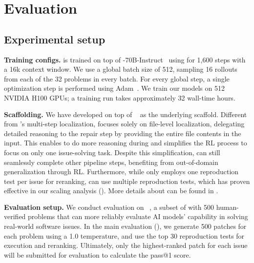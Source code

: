 \section{Evaluation}
\label{section:evaluation}

\subsection{Experimental setup}
\label{subsec:setup}

\textbf{Training configs.}
\ours[70] is trained on top of -70B-Instruct~\cite{llama31} using \tech for 1,600 steps with a 16k context window.
We use a global batch size of 512, sampling 16 rollouts from each of the 32 problems in every batch.
For every global step, a single optimization step is performed using Adam~\cite{adam}.
We train our models on 512 NVIDIA H100 GPUs; a training run takes approximately 32 wall-time hours.

\textbf{Scaffolding.}
We have developed \ouragentless on top of \agentless~\cite{agentless} as the underlying scaffold.
Different from \agentless's multi-step localization, \ouragentless focuses solely on file-level localization, delegating detailed reasoning to the repair step by providing the entire file contents in the input.
This enables \ours to do more reasoning during \tech and simplifies the RL process to focus on only one issue-solving task.
Despite this simplification, \ours can still seamlessly complete other pipeline steps, benefiting from out-of-domain generalization through RL.
Furthermore, while \agentless only employs one reproduction test per issue for reranking, \ouragentless can use multiple reproduction tests, which has proven effective in our scaling analysis ().
More details about \ouragentless can be found in .

\textbf{Evaluation setup.}
We conduct evaluation on \swebverified~\cite{swebverified}, a subset of \swebench with 500 human-verified problems that can more reliably evaluate AI models' capability in solving real-world software issues.
In the main evaluation (), we generate 500 patches for each problem using a 1.0 temperature, and use the top 30 reproduction tests for execution and reranking.
Ultimately, only the highest-ranked patch for each issue will be submitted for \swebench evaluation to calculate the pass@1 score.

